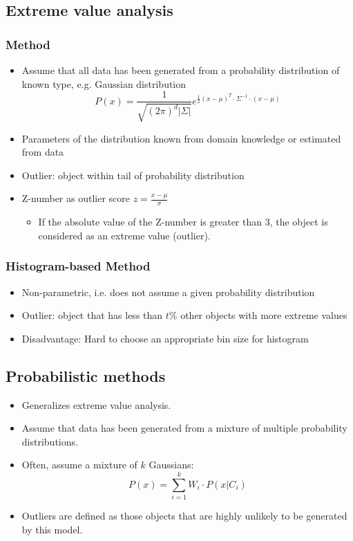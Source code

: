 \documentclass{article}
\begin{document}
\subsection{Extreme value analysis}
\subsubsection{Method}
\begin{itemize}
  \item Assume that all data has been generated from a probability distribution of known type, e.g. Gaussian distribution
  $$P(x) = \frac{1}{\sqrt{(2 \pi)^d |\Sigma|}} e^{\frac{1}{2}(x-\mu)^T \cdot \Sigma^{-1} \cdot (x-\mu)}$$
  \item Parameters of the distribution known from domain knowledge or estimated from data
  \item Outlier: object within tail of probability distribution
  \item Z-number as outlier score $z = \frac{x - \mu}{\sigma}$ 
  \begin{itemize}
    \item If the absolute value of the Z-number is greater than 3, the object is considered as an extreme value (outlier).
  \end{itemize}   
\end{itemize}

\subsubsection{Histogram-based Method}
\begin{itemize}
  \item Non-parametric, i.e. does not assume a given probability distribution
  \item Outlier: object that has less than $t\%$ other objects with more extreme values
  \item Disadvantage: Hard to choose an appropriate bin size for histogram
\end{itemize}

\newpage

\subsection{Probabilistic methods}
\begin{itemize}
  \item Generalizes extreme value analysis.
  \item Assume that data has been generated from a mixture of multiple probability distributions.
  \item Often, assume a mixture of $k$ Gaussians:
  $$P(x) = \sum_{i=1}^k W_i \cdot P(x|C_i)$$
  \item Outliers are defined as those objects that are highly unlikely to be generated by this model.
\end{itemize}
\end{document}
